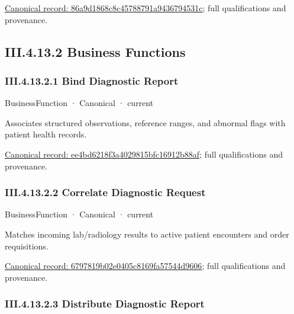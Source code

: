 {\footnotesize \href{../../../../continuum/business/business-service/86a9d1868c8c45788791a9436794531c.md}{Canonical record: 86a9d1868c8c45788791a9436794531c}; full qualifications and provenance.}\par
\subsection*{III.4.13.2 Business Functions}
\label{navigation:III.4.13.2}

\subsubsection*{III.4.13.2.1 Bind Diagnostic Report}
\label{navigation:III.4.13.2.1}

\label{element:ee4bd6218f3a4029815bfc16912b88af}
{\small BusinessFunction · Canonical · current}\par

Associates structured observations, reference ranges, and abnormal flags with patient health records.


{\footnotesize \href{../../../../continuum/business/business-function/ee4bd6218f3a4029815bfc16912b88af.md}{Canonical record: ee4bd6218f3a4029815bfc16912b88af}; full qualifications and provenance.}\par
\subsubsection*{III.4.13.2.2 Correlate Diagnostic Request}
\label{navigation:III.4.13.2.2}

\label{element:6797819b02e0405c8169fa57544d9606}
{\small BusinessFunction · Canonical · current}\par

Matches incoming lab/radiology results to active patient encounters and order requisitions.


{\footnotesize \href{../../../../continuum/business/business-function/6797819b02e0405c8169fa57544d9606.md}{Canonical record: 6797819b02e0405c8169fa57544d9606}; full qualifications and provenance.}\par
\subsubsection*{III.4.13.2.3 Distribute Diagnostic Report}
\label{navigation:III.4.13.2.3}

